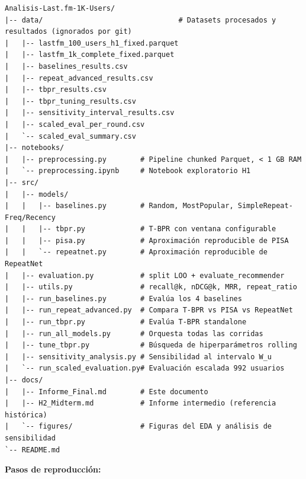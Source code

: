 \documentclass{article}
\begin{document}
\begin{verbatim}
Analisis-Last.fm-1K-Users/
|-- data/                                # Datasets procesados y resultados (ignorados por git)
|   |-- lastfm_100_users_h1_fixed.parquet
|   |-- lastfm_1k_complete_fixed.parquet
|   |-- baselines_results.csv
|   |-- repeat_advanced_results.csv
|   |-- tbpr_results.csv
|   |-- tbpr_tuning_results.csv
|   |-- sensitivity_interval_results.csv
|   |-- scaled_eval_per_round.csv
|   `-- scaled_eval_summary.csv
|-- notebooks/
|   |-- preprocessing.py        # Pipeline chunked Parquet, < 1 GB RAM
|   `-- preprocessing.ipynb     # Notebook exploratorio H1
|-- src/
|   |-- models/
|   |   |-- baselines.py        # Random, MostPopular, SimpleRepeat-Freq/Recency
|   |   |-- tbpr.py             # T-BPR con ventana configurable
|   |   |-- pisa.py             # Aproximación reproducible de PISA
|   |   `-- repeatnet.py        # Aproximación reproducible de RepeatNet
|   |-- evaluation.py           # split LOO + evaluate_recommender
|   |-- utils.py                # recall@k, nDCG@k, MRR, repeat_ratio
|   |-- run_baselines.py        # Evalúa los 4 baselines
|   |-- run_repeat_advanced.py  # Compara T-BPR vs PISA vs RepeatNet
|   |-- run_tbpr.py             # Evalúa T-BPR standalone
|   |-- run_all_models.py       # Orquesta todas las corridas
|   |-- tune_tbpr.py            # Búsqueda de hiperparámetros rolling
|   |-- sensitivity_analysis.py # Sensibilidad al intervalo W_u
|   `-- run_scaled_evaluation.py# Evaluación escalada 992 usuarios
|-- docs/
|   |-- Informe_Final.md        # Este documento
|   |-- H2_Midterm.md           # Informe intermedio (referencia histórica)
|   `-- figures/                # Figuras del EDA y análisis de sensibilidad
`-- README.md
\end{verbatim}

\textbf{Pasos de reproducción:}

\begin{Shaded}
\begin{Highlighting}[]






\end{Highlighting}
\end{Shaded}
\end{document}
